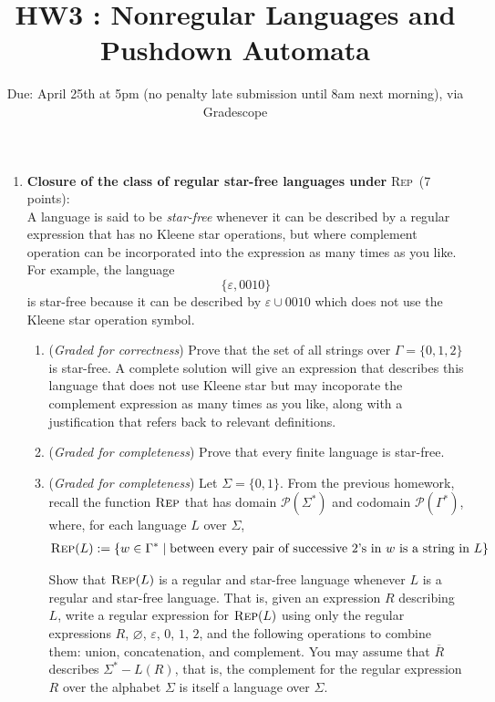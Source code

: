 \documentclass[12pt, oneside]{article}
\newcommand{\gradeCorrect}{({\it Graded for correctness}) }
\newcommand{\gradeComplete}{({\it Graded for completeness}) }
\newcommand{\REP}{\textsc{Rep}}
\begin{document}
\begin{enumerate}
\item {\bf Closure of the class of regular star-free languages under} \REP~(7 points):\\
A language is said to be \emph{star-free} whenever it can be described by a regular expression that 
has no Kleene star operations, but where complement operation can be 
incorporated into the expression as many times as you like. 
For example, the language $$\{\varepsilon, 0010\}$$ is star-free because it can be described
by $\varepsilon \cup 0010$ which does not use the Kleene star operation symbol.
\begin{enumerate}
    \item\gradeCorrect Prove that the set of all strings 
    over $\Gamma = \{0,1,2\}$ is star-free. A complete solution
    will give an expression that describes this language 
    that does not use Kleene star but may incoporate the complement
    expression as many times as you like, along 
    with a justification that refers back to relevant definitions.
    \item\gradeComplete Prove that every finite language is star-free.
    \item\gradeComplete Let $\Sigma = \{0,1\}$. From the previous
    homework, recall the function $\REP$ that has domain 
    $\mathcal{P}(\Sigma^*)$ and codomain $\mathcal{P}(\Gamma^*)$, 
    where, for each language $L$ over $\Sigma$,
    \begin{align*}
        \REP(L) &:= \{ w \in \Gamma^* \mid \text{between every 
    pair of successive $2$'s in $w$ is a string in $L$}\}
    \end{align*}
    
    Show that $\REP(L)$ is a regular and star-free language 
    whenever $L$ is a regular and star-free language. That is, 
    given an expression $R$ describing $L$, write a regular 
    expression for $\REP(L)$ using only the regular expressions 
    $R$, $\varnothing$, $\varepsilon$, $0$, $1$, $2$, and the 
    following operations to combine them: union, concatenation, 
    and complement. You may assume that $\overline{R}$
    describes $\Sigma^* -L(R)$, that is, the complement for the regular expression $R$ over the alphabet $\Sigma$ is itself 
    a language over $\Sigma$. 
\end{enumerate}

\end{enumerate}

\newpage

\title{HW3 : Nonregular Languages and Pushdown Automata}
\date{Due: April 25th at 5pm (no penalty late submission until 8am next morning), via Gradescope}
\end{document}
